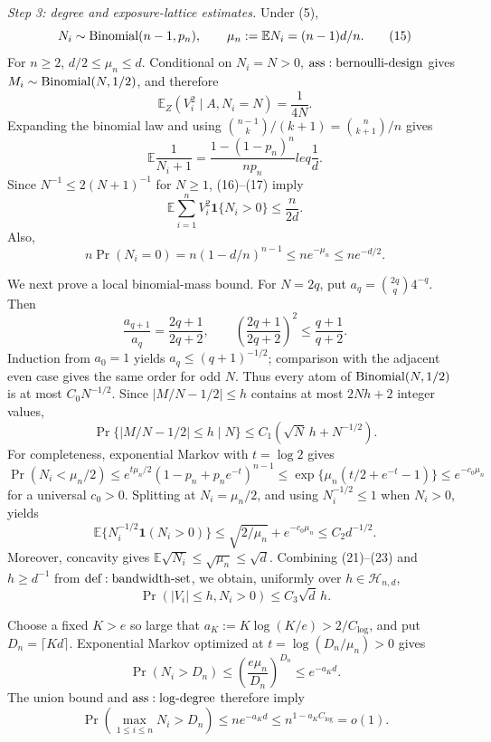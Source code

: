\textit{Step 3: degree and exposure-lattice estimates.}
Under (5),
\[
 N_i\sim{\rm Binomial}(n-1,p_n),
 \qquad
 \mu_n:=\mathbb EN_i=(n-1)d/n.
\tag{15}
\]
For \(n\geq2\), \(d/2\leq\mu_n\leq d\).  Conditional on \(N_i=N>0\), \({\rm ass:bernoulli\text{-}design}\) gives \(M_i\sim{\rm Binomial}(N,1/2)\), and therefore
\[
 \mathbb E_Z(V_i^2\mid A,N_i=N)=\frac1{4N}.
\tag{16}
\]
Expanding the binomial law and using \({n-1\choose k}/(k+1)={n\choose k+1}/n\) gives
\[
 \mathbb E\frac1{N_i+1}
 =\frac{1-(1-p_n)^n}{np_n}leq\frac1d.
\tag{17}
\]
Since \(N^{-1}\leq2(N+1)^{-1}\) for \(N\geq1\), (16)--(17) imply
\[
 \mathbb E\sum_{i=1}^nV_i^2\mathbf1\{N_i>0\}
 \leq\frac n{2d}.
\tag{18}
\]
Also,
\[
 n\Pr(N_i=0)=n(1-d/n)^{n-1}
 \leq ne^{-\mu_n}\leq ne^{-d/2}.
\tag{19}
\]

We next prove a local binomial-mass bound.  For \(N=2q\), put
\(a_q={2q\choose q}4^{-q}\).  Then
\[
 \frac{a_{q+1}}{a_q}=\frac{2q+1}{2q+2},
 \qquad
 \left(\frac{2q+1}{2q+2}\right)^2\leq\frac{q+1}{q+2}.
\tag{20}
\]
Induction from \(a_0=1\) yields \(a_q\leq(q+1)^{-1/2}\); comparison with the adjacent even case gives the same order for odd \(N\).  Thus every atom of \({\rm Binomial}(N,1/2)\) is at most \(C_0N^{-1/2}\).  Since \(|M/N-1/2|\leq h\) contains at most \(2Nh+2\) integer values,
\[
 \Pr\{|M/N-1/2|\leq h\mid N\}
 \leq C_1(\sqrt N\,h+N^{-1/2}).
\tag{21}
\]
For completeness, exponential Markov with \(t=\log2\) gives
\[
 \Pr(N_i<\mu_n/2)
 \leq e^{t\mu_n/2}(1-p_n+p_ne^{-t})^{n-1}
 \leq\exp\{\mu_n(t/2+e^{-t}-1)\}
 \leq e^{-c_0\mu_n}
\tag{22}
\]
for a universal \(c_0>0\).  Splitting at \(N_i=\mu_n/2\), and using \(N_i^{-1/2}\leq1\) when \(N_i>0\), yields
\[
 \mathbb E\{N_i^{-1/2}\mathbf1(N_i>0)\}
 \leq\sqrt{2/\mu_n}+e^{-c_0\mu_n}
 \leq C_2d^{-1/2}.
\tag{23}
\]
Moreover, concavity gives \(\mathbb E\sqrt{N_i}\leq\sqrt{\mu_n}\leq\sqrt d\).  Combining (21)--(23) and \(h\geq d^{-1}\) from \({\rm def:bandwidth\text{-}set}\), we obtain, uniformly over \(h\in\mathcal H_{n,d}\),
\[
 \Pr(|V_i|\leq h,N_i>0)\leq C_3\sqrt d\,h.
\tag{24}
\]

Choose a fixed \(K>e\) so large that
\(a_K:=K\log(K/e)>2/C_{\log}\), and put \(D_n=\lceil Kd\rceil\).  Exponential Markov optimized at \(t=\log(D_n/\mu_n)>0\) gives
\[
 \Pr(N_i>D_n)
 \leq\left(\frac{e\mu_n}{D_n}\right)^{D_n}
 \leq e^{-a_Kd}.
\tag{25}
\]
The union bound and \({\rm ass:log\text{-}degree}\) therefore imply
\[
 \Pr\left(\max_{1\leq i\leq n}N_i>D_n\right)
 \leq ne^{-a_Kd}
 \leq n^{1-a_KC_{\log}}=o(1).
\tag{26}
\]

